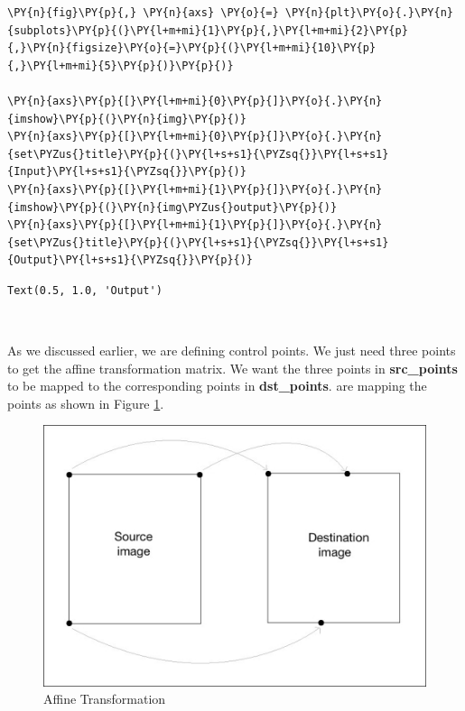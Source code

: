\begin{tcolorbox}[breakable, size=fbox, boxrule=1pt, pad at break*=1mm,colback=cellbackground, colframe=cellborder]
	\begin{Verbatim}[commandchars=\\\{\}]
\PY{n}{fig}\PY{p}{,} \PY{n}{axs} \PY{o}{=} \PY{n}{plt}\PY{o}{.}\PY{n}{subplots}\PY{p}{(}\PY{l+m+mi}{1}\PY{p}{,}\PY{l+m+mi}{2}\PY{p}{,}\PY{n}{figsize}\PY{o}{=}\PY{p}{(}\PY{l+m+mi}{10}\PY{p}{,}\PY{l+m+mi}{5}\PY{p}{)}\PY{p}{)}
		
\PY{n}{axs}\PY{p}{[}\PY{l+m+mi}{0}\PY{p}{]}\PY{o}{.}\PY{n}{imshow}\PY{p}{(}\PY{n}{img}\PY{p}{)}
\PY{n}{axs}\PY{p}{[}\PY{l+m+mi}{0}\PY{p}{]}\PY{o}{.}\PY{n}{set\PYZus{}title}\PY{p}{(}\PY{l+s+s1}{\PYZsq{}}\PY{l+s+s1}{Input}\PY{l+s+s1}{\PYZsq{}}\PY{p}{)}
\PY{n}{axs}\PY{p}{[}\PY{l+m+mi}{1}\PY{p}{]}\PY{o}{.}\PY{n}{imshow}\PY{p}{(}\PY{n}{img\PYZus{}output}\PY{p}{)}
\PY{n}{axs}\PY{p}{[}\PY{l+m+mi}{1}\PY{p}{]}\PY{o}{.}\PY{n}{set\PYZus{}title}\PY{p}{(}\PY{l+s+s1}{\PYZsq{}}\PY{l+s+s1}{Output}\PY{l+s+s1}{\PYZsq{}}\PY{p}{)}
	\end{Verbatim}
\end{tcolorbox}

\begin{tcolorbox}[breakable, size=fbox, boxrule=.5pt, pad at break*=1mm, opacityfill=0]
	\begin{Verbatim}[commandchars=\\\{\}]
Text(0.5, 1.0, 'Output')
	\end{Verbatim}
\end{tcolorbox}

\begin{center}
\end{center}
{ \hspace*{\fill} \\}

As we discussed earlier, we are defining control points. We just need three points to get the affine transformation 	matrix. We want the three points in \textbf{src\_points} to be mapped to the corresponding points in \textbf{dst\_points}. are mapping the points as shown in Figure \ref{fig25}.

\begin{figure}[H]
	\centering \includegraphics[width=0.6\columnwidth]{figures/Fig25.png}
	\caption{Affine Transformation}
	\label{fig25}
\end{figure}

